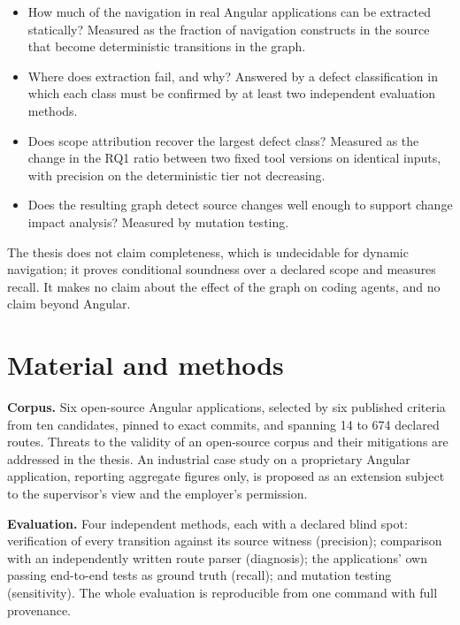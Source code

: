 \documentclass[11pt,a4paper]{article}
\begin{document}
\begin{itemize}[leftmargin=2.4em]
  \item[\textbf{RQ1}] How much of the navigation in real Angular applications can be
        extracted statically? Measured as the fraction of navigation constructs in the
        source that become deterministic transitions in the graph.
  \item[\textbf{RQ2}] Where does extraction fail, and why? Answered by a defect
        classification in which each class must be confirmed by at least two
        independent evaluation methods.
  \item[\textbf{RQ3}] Does scope attribution recover the largest defect class? Measured
        as the change in the RQ1 ratio between two fixed tool versions on identical
        inputs, with precision on the deterministic tier not decreasing.
  \item[\textbf{RQ4}] Does the resulting graph detect source changes well enough to
        support change impact analysis? Measured by mutation testing.
\end{itemize}

The thesis does not claim completeness, which is undecidable for dynamic navigation;
it proves conditional soundness over a declared scope and measures recall. It makes no
claim about the effect of the graph on coding agents, and no claim beyond Angular.

\section{Material and methods}

\textbf{Corpus.} Six open-source Angular applications, selected by six published
criteria from ten candidates, pinned to exact commits, and spanning 14 to 674 declared
routes. Threats to the validity of an open-source corpus and their mitigations are
addressed in the thesis. An industrial case study on a proprietary Angular
application, reporting aggregate figures only, is proposed as an extension subject to
the supervisor's view and the employer's permission.

\textbf{Evaluation.} Four independent methods, each with a declared blind spot:
verification of every transition against its source witness (precision); comparison
with an independently written route parser (diagnosis); the applications' own passing
end-to-end tests as ground truth (recall); and mutation testing (sensitivity). The
whole evaluation is reproducible from one command with full provenance.
\end{document}
